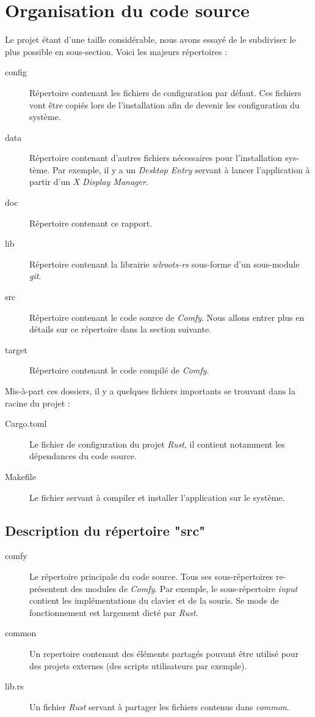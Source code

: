 \documentclass[titlepage]{article}
\begin{document}
\section{Organisation du code source}
Le projet étant d'une taille considérable, nous avons essayé de le subdiviser le plus possible en sous-section. Voici les majeurs répertoires :
\begin{description}
	\item [config] Répertoire contenant les fichiers de configuration par défaut. Ces fichiers vont être copiés lors de l'installation afin de devenir les configuration du système.
	\item [data] Répertoire contenant d'autres fichiers nécessaires pour l'installation sys-tème. Par exemple, il y a un \textit{Desktop Entry} servant à lancer l'application à partir d'un \textit{X Display Manager}.
	\item [doc] Répertoire contenant ce rapport.
	\item [lib] Répertoire contenant la librairie \textit{wlroots-rs} sous-forme d'un sous-module \textit{git}.
	\item [src] Répertoire contenant le code source de \textit{Comfy}. Nous allons entrer plus en détails sur ce répertoire dans la section suivante.
	\item [target] Répertoire contenant le code compilé de \textit{Comfy}.
\end{description}

Mis-à-part ces dossiers, il y a quelques fichiers importants se trouvant dans la racine du projet :
\begin{description}
	\item [Cargo.toml] Le fichier de configuration du projet \textit{Rust}, il contient notamment les dépendances du code source.
	\item [Makefile] Le fichier servant à compiler et installer l'application sur le système.
\end{description}
\subsection{Description du répertoire "src"}
\begin{description}
	\item [comfy] Le répertoire principale du code source. Tous ses sous-répertoires re-présentent des modules de \textit{Comfy}. Par exemple, le sous-répertoire \textit{input} contient les implémentations du clavier et de la souris. Se mode de fonctionnement est largement dicté par \textit{Rust}.
	\item [common] Un repertoire contenant des éléments partagés pouvant être utilisé pour des projets externes (des scripts utilisateurs par exemple).
	\item [lib.rs] Un fichier \textit{Rust} servant à partager les fichiers contenus dans \textit{common}.
\end{description}
\end{document}

